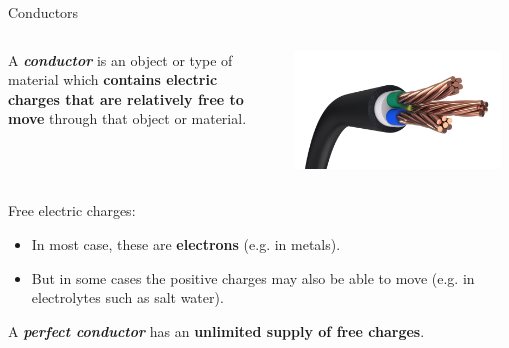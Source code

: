 
%
%
%

\begin{frame}{Conductors}

\begin{columns}
  \begin{column}{0.70\textwidth}
    A {\bf {\em conductor}} is an object or type of material
    which {\bf contains electric charges that are relatively free to move} through that object or material.\\
  \end{column}
  \begin{column}{0.30\textwidth}
     \includegraphics[width=0.95\textwidth]{./images/photos/power_cable_01.jpg}\\
  \end{column}
\end{columns}

\vspace{0.3cm}

Free electric charges:
\begin{itemize}
  \item In most case, these are {\bf electrons} (e.g. in metals).
  \item But in some cases the positive charges may also be able to move
  (e.g. in electrolytes such as salt water).
\end{itemize}

\vspace{0.3cm}
A {\em \bf perfect conductor} has an {\bf unlimited supply of free charges}.

\end{frame}

%
%
%

